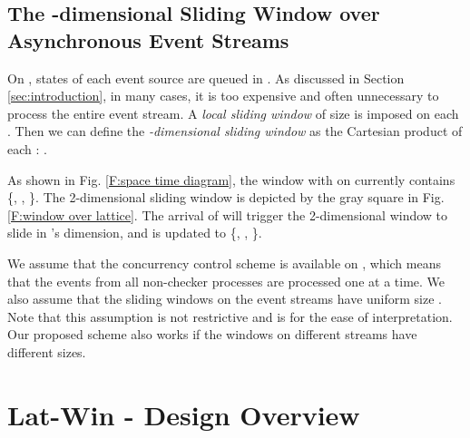 \documentclass[12pt,journal,letterpaper,compsoc]{IEEEtran}
\begin{document}
\subsection{The -dimensional Sliding Window over Asynchronous Event Streams}

On , states of each event source  are queued in . As discussed in Section \ref{sec:introduction}, in many cases, it is too expensive and often unnecessary to process the entire event stream. A {\it local sliding window}  of size  is imposed on each . Then we can define the {\it -dimensional sliding window}  as the Cartesian product of each : .

As shown in Fig. \ref{F:space time diagram}, the window  with  on  currently contains \{, , \}. The 2-dimensional sliding window  is depicted by the gray square in Fig. \ref{F:window over lattice}. The arrival of  will trigger the 2-dimensional window to slide in 's dimension, and  is updated to \{, , \}.

We assume that the concurrency control scheme is available on , which means that the events from all non-checker processes are processed one at a time. We also assume that the sliding windows on the event streams have uniform size . Note that this assumption is not restrictive and is for the ease of interpretation. Our proposed scheme also works if the windows on different streams have different sizes.

\section{Lat-Win - Design Overview}
\label{sec:design-overview}
\end{document}
